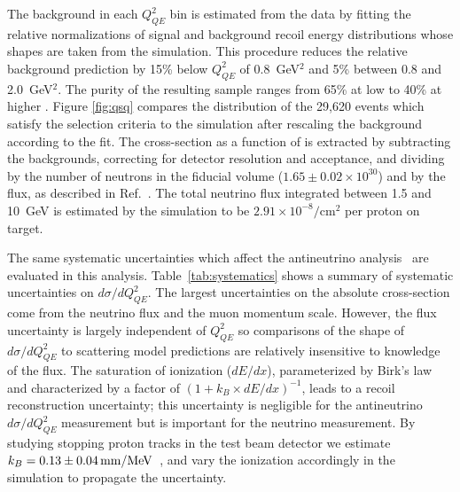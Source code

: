 The background in each $Q^2_{QE}$ bin is estimated from the data by fitting the relative normalizations of signal and background recoil energy distributions whose shapes are taken from the simulation.   This procedure reduces the relative background prediction by 15\% below $Q^2_{QE}$ of 0.8~GeV$^2$ and 5\% between 0.8 and 2.0~GeV$^2$.  The purity of the resulting sample 
ranges from 65\% at low \Qsqqe to 40\% at higher \Qsqqe.
Figure \ref{fig:qsq} compares the \Qsqqe distribution 
of the 29,620 events which satisfy the selection criteria to 
the simulation after rescaling the background according to the fit.
The cross-section as a function of \Qsqqe is extracted by subtracting the backgrounds, correcting for detector resolution and acceptance, and dividing by the number of neutrons in the fiducial volume ($1.65 \pm 0.02 \times 10^{30}$) and by the flux, as described in Ref.~\cite{nubarprl}.  The total neutrino 
flux integrated between 1.5 and 10~GeV is estimated by the simulation to be 
$2.91\times 10^{-8}/$cm$^2$ per proton on target.

The same systematic uncertainties which affect the antineutrino
analysis~\cite{nubarprl} are evaluated in this analysis.  
Table~\ref{tab:systematics} shows a summary of
systematic uncertainties on $d\sigma/dQ^2_{QE}$. 
The largest uncertainties on the absolute cross-section 
come from the neutrino flux and the muon momentum scale.  
However, the flux uncertainty is largely independent of $Q^2_{QE}$ so comparisons of the shape of $d\sigma/dQ^2_{QE}$  to scattering model predictions are relatively insensitive to knowledge of the flux. 
The saturation of ionization ($dE/dx$), parameterized by Birk's law and characterized by a factor of $(1 + k_B\times dE/dx)^{-1}$, leads to a recoil reconstruction uncertainty; this uncertainty is negligible for the antineutrino $d\sigma/dQ^2_{QE}$ measurement but is important for the neutrino measurement.
By studying stopping proton tracks in the \minerva test beam detector
we estimate $k_B=\unit[0.13\pm0.04]{mm/MeV}$~\cite{minerva_nim}, and vary
the ionization accordingly in the simulation to propagate the uncertainty.



